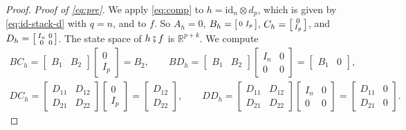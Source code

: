 \documentclass[11pt,a4paper]{article}
\theoremstyle{plain}
\theoremstyle{definition}
\theoremstyle{remark}
\newcommand{\R}{\mathbb{R}}
\newcommand{\id}{\mathrm{id}}
\newcommand{\then}{\mathbin{\fatsemi}}
\begin{document}
\begin{proof}
    \emph{Proof of \cref{eq:pre}.}
    We apply \cref{eq:comp} to $h = \id_n \otimes d_p$, which is given by \cref{eq:id-stack-d} with $q = n$, and to $f$.
    So $A_h = 0$, $B_h = \begin{bsmallmatrix} 0 & I_p \end{bsmallmatrix}$, $C_h = \begin{bsmallmatrix} 0 \\ I_p \end{bsmallmatrix}$, and $D_h = \begin{bsmallmatrix} I_n & 0 \\ 0 & 0 \end{bsmallmatrix}$.
    The state space of $h \then f$ is $\R^{p+k}$.
    We compute
    \begin{gather*}
        B C_h = \begin{bmatrix} B_1 & B_2 \end{bmatrix} \begin{bmatrix} 0 \\ I_p \end{bmatrix} = B_2,
        \qquad
        B D_h = \begin{bmatrix} B_1 & B_2 \end{bmatrix} \begin{bmatrix} I_n & 0 \\ 0 & 0 \end{bmatrix} = \begin{bmatrix} B_1 & 0 \end{bmatrix}, \\
        D C_h = \begin{bmatrix} D_{11} & D_{12} \\ D_{21} & D_{22} \end{bmatrix} \begin{bmatrix} 0 \\ I_p \end{bmatrix} = \begin{bmatrix} D_{12} \\ D_{22} \end{bmatrix},
        \qquad
        D D_h = \begin{bmatrix} D_{11} & D_{12} \\ D_{21} & D_{22} \end{bmatrix} \begin{bmatrix} I_n & 0 \\ 0 & 0 \end{bmatrix} = \begin{bmatrix} D_{11} & 0 \\ D_{21} & 0 \end{bmatrix} .

\end{gather*}
\end{proof}
\end{document}

